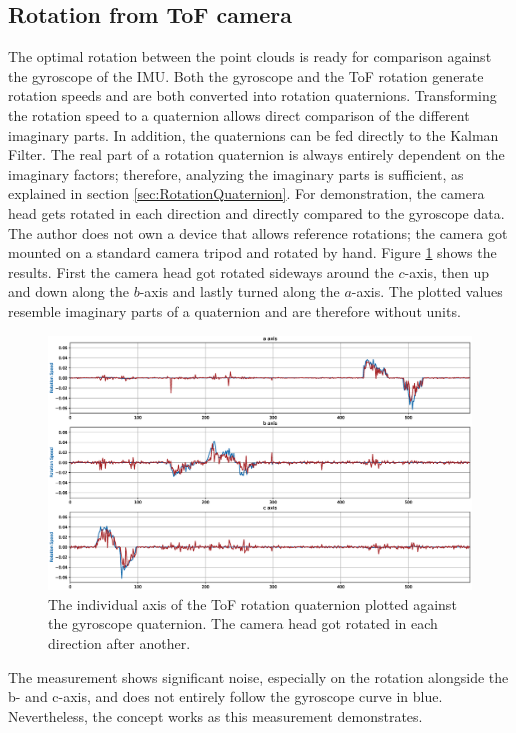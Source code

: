 \subsection{Rotation from ToF camera}
\label{sec:results_tof_rotation}
The optimal rotation between the point clouds is ready for comparison against the gyroscope of the IMU. Both the gyroscope and the ToF rotation generate rotation speeds and are both converted into rotation quaternions. Transforming the rotation speed to a quaternion allows direct comparison of the different imaginary parts. In addition, the quaternions can be fed directly to the Kalman Filter. The real part of a rotation quaternion is always entirely dependent on the imaginary factors; therefore, analyzing the imaginary parts is sufficient, as explained in section \ref{sec:RotationQuaternion}.
For demonstration, the camera head gets rotated in each direction and directly compared to the gyroscope data. The author does not own a device that allows reference rotations; the camera got mounted on a standard camera tripod and rotated by hand. Figure \ref{im:tof_rotation_measurement} shows the results. First the camera head got rotated sideways around the $c$-axis, then up and down along the $b$-axis and lastly turned along the $a$-axis. The plotted values resemble imaginary parts of a quaternion and are therefore without units.
\begin{figure}[H]
  \centering
  \includegraphics[width=1.0\textwidth]{images/tof_rotation_measurement.eps}
  \caption{The individual axis of the ToF rotation quaternion plotted against the gyroscope quaternion. The camera head got rotated in each direction after another.}
  \label{im:tof_rotation_measurement}
\end{figure}
The measurement shows significant noise, especially on the rotation alongside the b- and c-axis, and does not entirely follow the gyroscope curve in blue. Nevertheless, the concept works as this measurement demonstrates. 
